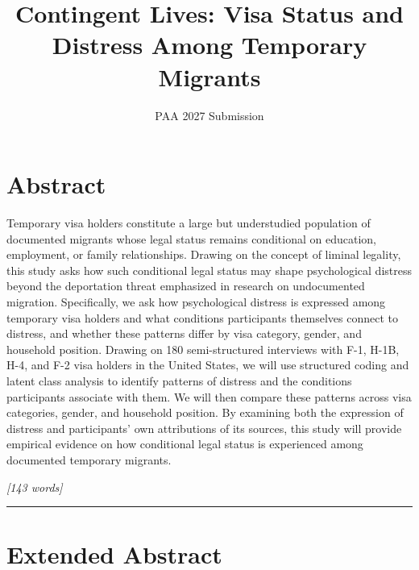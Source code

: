 \documentclass[12pt]{article}
\title{\textbf{Contingent Lives: Visa Status and Distress Among Temporary Migrants}}
\date{PAA 2027 Submission}
\begin{document}
\maketitle

\section*{Abstract}
Temporary visa holders constitute a large but understudied population of documented migrants whose legal status remains
conditional on education, employment, or family relationships. Drawing on the concept of liminal legality, this study asks
how such conditional legal status may shape psychological distress beyond the deportation threat emphasized in research
on undocumented migration. Specifically, we ask how psychological distress is expressed among temporary visa holders and
what conditions participants themselves connect to distress, and whether these patterns differ by visa category, gender,
and household position. Drawing on 180 semi-structured interviews with F-1, H-1B, H-4, and F-2 visa holders in the United States, we will use
structured coding and latent class analysis to identify patterns of distress and the conditions participants associate
with them. We will then compare these patterns across visa categories, gender, and household position. By examining both the expression of distress and participants' own attributions of its sources, this study will provide
empirical evidence on how conditional legal status is experienced among documented temporary migrants.

\vspace{0.5em}
\noindent\textit{[143 words]}

\vspace{1.5em}
\hrule
\vspace{1.5em}

\section*{Extended Abstract}
\end{document}

